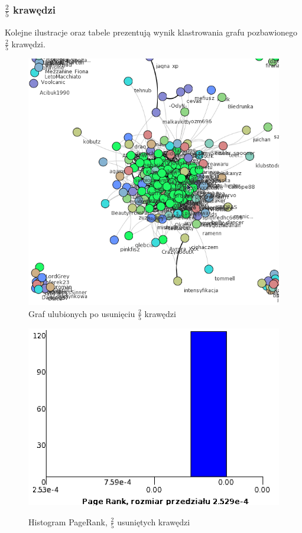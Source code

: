 \documentclass[10pt,a4paper]{article}
\begin{document}
\subsubsection {$\frac{2}{5}$ krawędzi}
  Kolejne ilustracje oraz tabele prezentują wynik klastrowania grafu pozbawionego  $\frac{2}{5}$  krawędzi.
\begin{figure}[H]
\centering
\caption{Graf ulubionych po usunięciu $\frac{2}{5}$ krawędzi}
\includegraphics[scale=0.5]{wyniki/final200Loved/2200loved.png}
\end{figure}

\begin{figure}[H]
\centering
\caption{Histogram PageRank, $\frac{2}{5}$ usuniętych krawędzi}
\includegraphics[scale=0.6]{wyniki/final200Loved/2200lovedPRHist.png}
\label{fig:1200lovedPRHist}
\end{figure}
\end{document}
